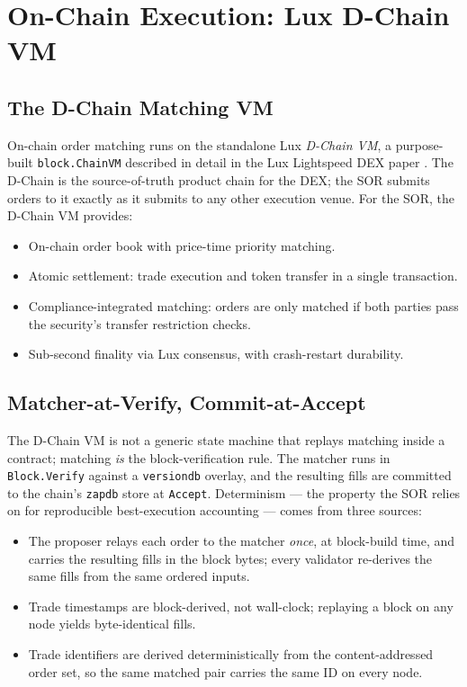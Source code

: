 \section{On-Chain Execution: Lux D-Chain VM}
\label{sec:dex}

\subsection{The D-Chain Matching VM}

On-chain order matching runs on the standalone Lux \emph{D-Chain VM}, a
purpose-built \texttt{block.ChainVM} described in detail in the Lux
Lightspeed DEX paper \cite{lux-lightspeed-dex}. The D-Chain is the
source-of-truth product chain for the DEX; the SOR submits orders to it
exactly as it submits to any other execution venue. For the SOR, the
D-Chain VM provides:

\begin{itemize}[nosep]
  \item On-chain order book with price-time priority matching.
  \item Atomic settlement: trade execution and token transfer in a single transaction.
  \item Compliance-integrated matching: orders are only matched if both parties pass the security's transfer restriction checks.
  \item Sub-second finality via Lux consensus, with crash-restart durability.
\end{itemize}

\subsection{Matcher-at-Verify, Commit-at-Accept}

The D-Chain VM is not a generic state machine that replays matching
inside a contract; matching \emph{is} the block-verification rule. The
matcher runs in \texttt{Block.Verify} against a \texttt{versiondb}
overlay, and the resulting fills are committed to the chain's
\texttt{zapdb} store at \texttt{Accept}. Determinism --- the property
the SOR relies on for reproducible best-execution accounting --- comes
from three sources:

\begin{itemize}[nosep]
  \item The proposer relays each order to the matcher \emph{once}, at
    block-build time, and carries the resulting fills in the block
    bytes; every validator re-derives the same fills from the same
    ordered inputs.
  \item Trade timestamps are block-derived, not wall-clock; replaying a
    block on any node yields byte-identical fills.
  \item Trade identifiers are derived deterministically from the
    content-addressed order set, so the same matched pair carries the
    same ID on every node.
\end{itemize}

